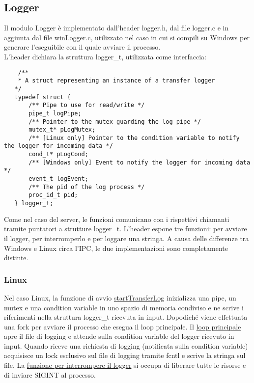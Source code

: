 \documentclass{article}
\begin{document}
\subsection{Logger}
Il modulo Logger è implementato dall'header logger.h, dal file logger.c e in aggiunta dal file winLogger.c,
utilizzato nel caso in cui si compili su Windows per generare l'eseguibile con il quale avviare il processo.\\
L'header dichiara la struttura logger\_t, utilizzata come interfaccia:
\begin{lstlisting}
    /**
    * A struct representing an instance of a transfer logger
   */
   typedef struct {
       /** Pipe to use for read/write */
       pipe_t logPipe;
       /** Pointer to the mutex guarding the log pipe */
       mutex_t* pLogMutex;
       /** [Linux only] Pointer to the condition variable to notify the logger for incoming data */
       cond_t* pLogCond;
       /** [Windows only] Event to notify the logger for incoming data */
       event_t logEvent;
       /** The pid of the log process */
       proc_id_t pid;
   } logger_t;
\end{lstlisting}
Come nel caso del server, le funzioni comunicano con i rispettivi chiamanti tramite puntatori a 
strutture logger\_t.
L'header espone tre funzioni: per avviare il logger, per interromperlo e per loggare una stringa.
A causa delle differenze tra Windows e Linux circa l'IPC, le due implementazioni sono completamente distinte.

\subsubsection{Linux}
Nel caso Linux, la funzione di avvio \href{html/logger_8c.html#a568bb98500e52ddc98667703cdc46927}{startTransferLog} inizializza una pipe, un mutex e una condition variable
in uno spazio di memoria condiviso e ne scrive i riferimenti nella struttura logger\_t ricevuta in input.
Dopodiché viene effettuata una fork per avviare il processo che esegua il loop principale.
Il \href{html/logger_8c.html#a27125c21f8cde1856449d4e02e42f156}{loop principale} apre il file di logging e attende sulla condition variable del logger ricevuto in input.
Quando riceve una richiesta di logging (notificata sulla condition variable) acquisisce un lock
esclusivo sul file di logging tramite fcntl e scrive la stringa sul file.
La \href{html/logger_8c.html#a5a3ad1e6309f96bc43ab8e56ea8ffd39}{funzione per interrompere il logger} si occupa di liberare tutte le risorse e di inviare SIGINT
al processo.
\end{document}
